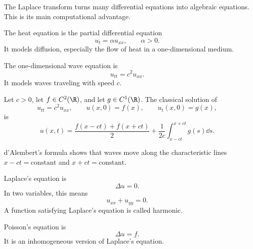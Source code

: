     \begin{remark}
        The Laplace transform turns many differential equations into algebraic
        equations. This is its main computational advantage.
    \end{remark}

    \begin{definition}
        The heat equation is the partial differential equation
        \[
            u_t=\alpha u_{xx},
            \qquad
            \alpha>0.
        \]
        It models diffusion, especially the flow of heat in a one-dimensional
        medium.
    \end{definition}

    \begin{definition}
        The one-dimensional wave equation is
        \[
            u_{tt}=c^2u_{xx}.
        \]
        It models waves traveling with speed $c$.
    \end{definition}

    \begin{theorem}
        Let $c>0$, let $f\in C^2(\R)$, and let $g\in C^1(\R)$. The classical
        solution of
        \[
            u_{tt}=c^2u_{xx},
            \qquad
            u(x,0)=f(x),
            \qquad
            u_t(x,0)=g(x),
        \]
        is
        \[
            u(x,t)
            =
            \frac{f(x-ct)+f(x+ct)}{2}
            +
            \frac{1}{2c}\int_{x-ct}^{x+ct}g(s)\dd s.
        \]
    \end{theorem}

    \begin{remark}
        d'Alembert's formula shows that waves move along the characteristic
        lines $x-ct=\text{constant}$ and $x+ct=\text{constant}$.
    \end{remark}

    \begin{definition}
        Laplace's equation is
        \[
            \Delta u=0.
        \]
        In two variables, this means
        \[
            u_{xx}+u_{yy}=0.
        \]
        A function satisfying Laplace's equation is called harmonic.
    \end{definition}

    \begin{definition}
        Poisson's equation is
        \[
            \Delta u=f.
        \]
        It is an inhomogeneous version of Laplace's equation.
    \end{definition}

